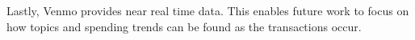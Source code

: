 \documentclass[conference]{IEEEtran}
\begin{document}
Lastly, Venmo provides near real time data. This enables future work to focus on how topics and spending trends can be found as the transactions occur.





%
%



%
%
\end{document}
